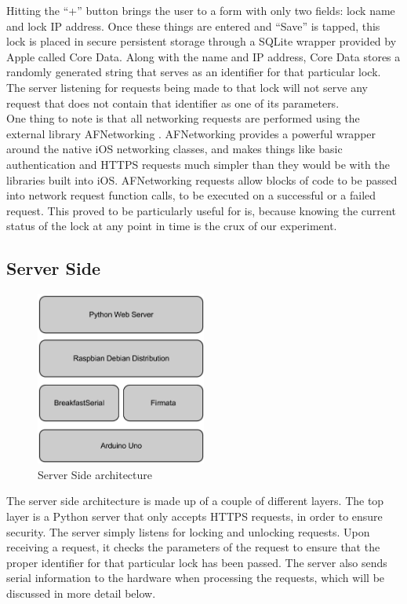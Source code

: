 \documentclass[10pt]{article}
\begin{document}
\begin{multicols}{2}
Hitting the ``+'' button brings the user to a form with only two fields: lock name and lock IP address. Once these things are entered and ``Save'' is tapped, this lock is placed in secure persistent storage through a SQLite wrapper provided by Apple called Core Data. Along with the name and IP address, Core Data stores a randomly generated string that serves as an identifier for that particular lock. The server listening for requests being made to that lock will not serve any request that does not contain that identifier as one of its parameters. \\

One thing to note is that all networking requests are performed using the external library AFNetworking \cite{afnetworking}. AFNetworking provides a powerful wrapper around the native iOS networking classes, and makes things like basic authentication and HTTPS requests much simpler than they would be with the libraries built into iOS. AFNetworking requests allow blocks of code to be passed into network request function calls, to be executed on a successful or a failed request. This proved to be particularly useful for is, because knowing the current status of the lock at any point in time is the crux of our experiment. \\

\subsection{Server Side}
\begin{figure}[H]
\centering
\includegraphics[width=0.5\textwidth]{stack.png}
\caption{Server Side architecture}
\end{figure}

The server side architecture is made up of a couple of different layers. The top layer is a Python server that only accepts HTTPS requests, in order to ensure security. The server simply listens for locking and unlocking requests. Upon receiving a request, it checks the parameters of the request to ensure that the proper identifier for that particular lock has been passed. The server also sends serial information to the hardware when processing the requests, which will be discussed in more detail below. \\


\end{multicols}
\end{document}
